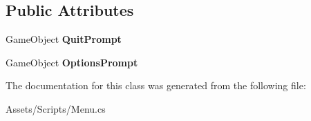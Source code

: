 \subsection*{Public Attributes}
\begin{DoxyCompactItemize}
\item 
\hypertarget{class_menu_abd86a8335538245eb7a19f9e9b1499b9}{}Game\+Object {\bfseries Quit\+Prompt}\label{class_menu_abd86a8335538245eb7a19f9e9b1499b9}

\item 
\hypertarget{class_menu_a9036eae33840ec19ecd1a85849d40ed8}{}Game\+Object {\bfseries Options\+Prompt}\label{class_menu_a9036eae33840ec19ecd1a85849d40ed8}

\end{DoxyCompactItemize}


The documentation for this class was generated from the following file\+:\begin{DoxyCompactItemize}
\item 
Assets/\+Scripts/Menu.\+cs\end{DoxyCompactItemize}
